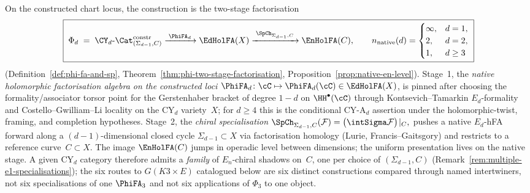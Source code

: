 On the constructed chart locus, the construction is the two-stage
factorisation
\[
 \boxed{\;
 \Phi_d
 \;=\;
 \CY_d\text{-}\Cat^{\mathrm{constr}}_{(\Sigma_{d-1},C)}
 \xrightarrow{\;\PhiFA_d\;}
 \EdHolFA(X)
 \xrightarrow{\;\SpCh_{\Sigma_{d-1}, C}\;}
 \EnHolFA(C),
 \qquad
 n_{\mathrm{native}}(d) = \begin{cases}\infty, & d = 1, \\ 2, & d = 2, \\
 1, & d \ge 3\end{cases}\;}
\]
(Definition~\ref{def:phi-fa-and-sp},
Theorem~\ref{thm:phi-two-stage-factorisation},
Proposition~\ref{prop:native-en-level}). Stage~1, the
\emph{native holomorphic factorisation algebra on the constructed loci}
$\PhiFA_d \colon \cC \mapsto \PhiFA_d(\cC) \in \EdHolFA(X)$,
is pinned after choosing the formality/associator torsor point for the
Gerstenhaber bracket of degree $1-d$ on $\HH^\bullet(\cC)$ through Kontsevich--Tamarkin
$E_d$-formality and Costello--Gwilliam--Li locality on the CY$_d$
variety~$X$; for $d\geq4$ this is the conditional CY-A$_d$ assertion
under the holomorphic-twist, framing, and completion hypotheses.
Stage~2, the \emph{chiral specialisation}
\(
 \SpCh_{\Sigma_{d-1}, C}(\cF)
 = \bigl(\intSigma \cF\bigr)\!\mid_C,
\)
pushes a native $E_d$-hFA forward along a $(d{-}1)$-dimensional
closed cycle $\Sigma_{d-1}\subset X$ via factorisation homology
(Lurie, Francis--Gaitsgory) and restricts to a reference
curve~$C\subset X$. The image $\EnHolFA(C)$ jumps in operadic
level between dimensions; the uniform presentation lives on
the native stage. A given CY$_d$ category therefore admits a
\emph{family} of $E_n$-chiral shadows on~$C$, one per choice of
$(\Sigma_{d-1}, C)$
	(Remark~\ref{rem:multiple-e1-specialisations}); the six routes
	to $G(K3\times E)$ catalogued below are six distinct
	constructions compared through named intertwiners, not six
	specialisations of one $\PhiFA_3$ and not six applications of
	$\Phi_3$ to one object.

